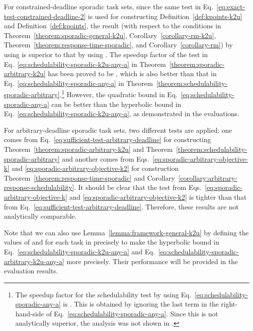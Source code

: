 \documentclass[10pt,conference]{IEEEtran}
\newcommand{\frameworkkq}[1]{}
\newcommand{\frameworkku}[1]{}
\begin{document}
For constrained-deadline sporadic task sets, since the same test in
Eq.~\eqref{eq:exact-test-constrained-deadline-2} is used for
constructing Definition~\ref{def:kpoints-k2u} and
Definition~\ref{def:kpoints}, the result (with respect to the
conditions in Theorem~\ref{theorem:sporadic-general-k2u},
Corollary~\ref{corollary-rm-k2u},
Theorem~\ref{theorem:response-time-sporadic}, and
Corollary~\ref{corollary-rm}) by using \frameworkku{} is superior to
that by using \frameworkkq{}. The speedup factor of the test in
Eq.~\eqref{eq:schedulability-sporadic-k2u-any-a} in
Theorem~\ref{theorem:sporadic-arbitrary-k2u} has been proved to be
, which is also better than that in
Eq.~\eqref{eq:schedulability-sporadic-any-a} in
Theorem~\ref{theorem:schedulability-sporadic-arbitrary}.\footnote{The
 speedup factor for the schedulability test by using Eq.~\eqref{eq:schedulability-sporadic-any-a} is . This
  is obtained by ignoring the last term in the right-hand-side of
  Eq.~\eqref{eq:schedulability-sporadic-any-a}. Since this is not
  analytically superior, the analysis was not shown in \cite{DBLP:journals/corr/abs-kRTA}.} 
However, the quadratic bound in
Eq.~\eqref{eq:schedulability-sporadic-any-a} can be better than the
hyperbolic bound in Eq.~\eqref{eq:schedulability-sporadic-k2u-any-a}, as demonstrated
in the evaluations. 


For arbitrary-deadline sporadic task sets, two different
tests are applied: one comes from
Eq.~\eqref{eq:sufficient-test-arbitrary-deadline} for constructing
Theorem~\ref{theorem:sporadic-arbitrary-k2u} and
Theorem~\ref{theorem:schedulability-sporadic-arbitrary} and another
comes from Eqs.~\eqref{eq:sporadic-arbitrary-objective-k} and
\eqref{eq:sporadic-arbitrary-objective-k2} for construction
Theorem~\ref{theorem:response-time-sporadic} and
Corollary~\ref{corollary:arbitrary-response-schedulability}. It should
be clear that the test from
Eqs.~\eqref{eq:sporadic-arbitrary-objective-k} and
\eqref{eq:sporadic-arbitrary-objective-k2} is tighter than that from
Eq.~\eqref{eq:sufficient-test-arbitrary-deadline}. Therefore, these
results are not analytically comparable. 




Note that we can also use Lemma~\ref{lemma:framework-general-k2u} by
defining the values of  and  for each task 
in  precisely to make the hyperbolic bound in
Eq.~\eqref{eq:schedulability-sporadic-k2u-any-a} and
Eq.~\eqref{eq:schedulability-sporadic-arbitrary-k2u-any-a} more
precisely. Their performance will be provided in the evaluation results.
\end{document}
